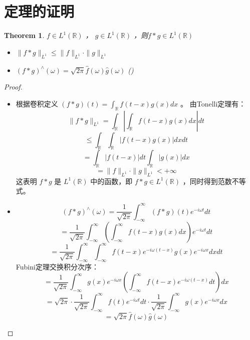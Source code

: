 \documentclass[linespread=1.5,openany]{book}%
\theoremstyle{plain}
\newtheorem{theorem}{Theorem}
\begin{document}
{{				\section{定理的证明}
				\begin{theorem}\(f\in L^1(\mathbb{R})\) ， \(g\in L^1(\mathbb{R})\) ，则\(f * g\in L^1(\mathbb{R})\) 
					\begin{itemize}
						\item[(i)]\(\|f * g\|_{L^1}\leq\|f\|_{L^1}\cdot\|g\|_{L^1}\)
						\item[(ii)]\((f * g)^{\wedge}(\omega)=\sqrt{2\pi}\hat{f}(\omega)\hat{g}(\omega)\) ()
					\end{itemize}
				\end{theorem}
				\begin{proof}
					\begin{itemize}
						\item[(i)]根据卷积定义 \((f * g)(t)=\int_{\mathbb{R}}f(t - x)g(x)dx\) 。
						由Tonelli定理有：
						\[
						\|f * g\|_{L^1}=\int_{\mathbb{R}}\left|\int_{\mathbb{R}}f(t - x)g(x)dx\right|dt\]
						\[\leq\int_{\mathbb{R}}\int_{\mathbb{R}}|f(t - x)g(x)|dxdt\]
						\[=\int_{\mathbb{R}}|f(t - x)|dt\int_{\mathbb{R}}|g(x)|dx \]
						\[=\|f\|_{L^1}\cdot\|g\|_{L^1}< +\infty	\]
						这表明 \(f * g\) 是 \(L^1(\mathbb{R})\) 中的函数，即 \(f * g\in L^1(\mathbb{R})\) ，同时得到范数不等式。
						\item[(ii)]\[(f * g)^{\wedge}(\omega)=\frac{1}{\sqrt{2\pi}}\int_{-\infty}^{\infty}(f * g)(t)e^{-i\omega t}dt\]
						\[=\frac{1}{\sqrt{2\pi}}\int_{-\infty}^{\infty}\left(\int_{-\infty}^{\infty}f(t - x)g(x)dx\right)e^{-i\omega t}dt\]
						\[=\frac{1}{\sqrt{2\pi}}\int_{-\infty}^{\infty}\int_{-\infty}^{\infty}f(t - x)e^{-i\omega (t - x)}g(x)e^{-i\omega x}dxdt \]
						Fubini定理交换积分次序：
						\[=\frac{1}{\sqrt{2\pi}}\int_{-\infty}^{\infty}g(x)e^{-i\omega x}\left(\int_{-\infty}^{\infty}f(t - x)e^{-i\omega (t - x)}dt\right)dx\]
						\[=\sqrt{2\pi}\cdot\frac{1}{\sqrt{2\pi}}\int_{-\infty}^{\infty}f(t)e^{-i\omega t}dt\cdot\frac{1}{\sqrt{2\pi}}\int_{-\infty}^{\infty}g(x)e^{-i\omega x}dx\]
						\[=\sqrt{2\pi}\hat{f}(\omega)\hat{g}(\omega)\]
						
					\end{itemize}
				\end{proof}
}}
\end{document}
